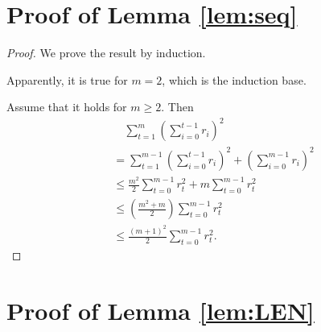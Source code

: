 \documentclass{article}
\theoremstyle{plain}
\begin{document}
\section{Proof of Lemma \ref{lem:seq}}

\begin{proof}
    We prove the result by induction. 
    
    Apparently, it is true for $m=2$, which is the induction base. 
    
Assume that it holds for $m \ge 2$. Then
\begin{align*}
    &\quad \sum_{t=1}^m \left(  \sum_{i=0}^{t-1} r_i\right)^2  \\
    &= \sum_{t=1}^{m-1} \left(  \sum_{i=0}^{t-1} r_i\right)^2 + \left( \sum_{i=0}^{m-1} r_i \right)^2 \\
    &\le \frac{m^2}{2} \sum_{t=0}^{m-1} r_t^2 + m \sum_{t=0}^{m-1} r_t^2 \\
    &\le \left( \frac{m^2 + m}{2} \right) \sum_{t=0}^{m-1} r_t^2 \\
    &\le \frac{(m+1)^2}{2} \sum_{t=0}^{m-1} r_t^2.
\end{align*}
\end{proof}


\section{Proof of Lemma \ref{lem:LEN}}
\end{document}
